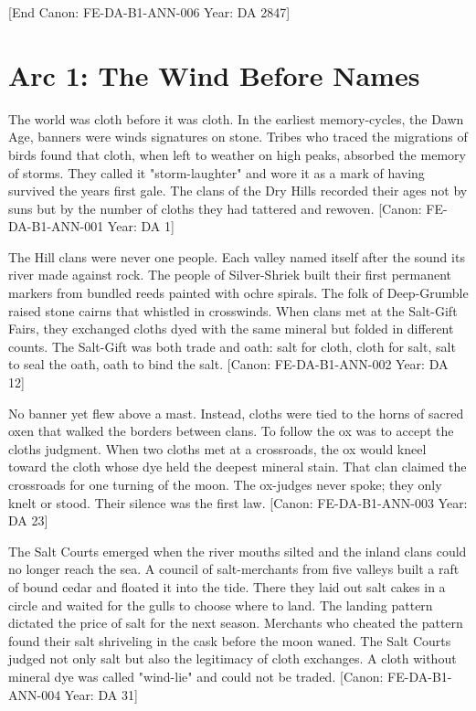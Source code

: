 {[}End Canon: FE-DA-B1-ANN-006 \textbar{} Year: DA 2847{]}

\section{Arc 1: \textquotesingle The Wind Before
Names\textquotesingle{}}\label{arc-1-the-wind-before-names}

The world was cloth before it was cloth. In the earliest memory-cycles,
the Dawn Age, banners were wind\textquotesingle s signatures on stone.
Tribes who traced the migrations of birds found that cloth, when left to
weather on high peaks, absorbed the memory of storms. They called it
"storm-laughter" and wore it as a mark of having survived the
year\textquotesingle s first gale. The clans of the Dry Hills recorded
their ages not by suns but by the number of cloths they had tattered and
rewoven. {[}Canon: FE-DA-B1-ANN-001 \textbar{} Year: DA 1{]}

The Hill clans were never one people. Each valley named itself after the
sound its river made against rock. The people of Silver-Shriek built
their first permanent markers from bundled reeds painted with ochre
spirals. The folk of Deep-Grumble raised stone cairns that whistled in
crosswinds. When clans met at the Salt-Gift Fairs, they exchanged cloths
dyed with the same mineral but folded in different counts. The Salt-Gift
was both trade and oath: salt for cloth, cloth for salt, salt to seal
the oath, oath to bind the salt. {[}Canon: FE-DA-B1-ANN-002 \textbar{}
Year: DA 12{]}

No banner yet flew above a mast. Instead, cloths were tied to the horns
of sacred oxen that walked the borders between clans. To follow the ox
was to accept the cloth\textquotesingle s judgment. When two cloths met
at a crossroads, the ox would kneel toward the cloth whose dye held the
deepest mineral stain. That clan claimed the crossroads for one turning
of the moon. The ox-judges never spoke; they only knelt or stood. Their
silence was the first law. {[}Canon: FE-DA-B1-ANN-003 \textbar{} Year:
DA 23{]}

The Salt Courts emerged when the river mouths silted and the inland
clans could no longer reach the sea. A council of salt-merchants from
five valleys built a raft of bound cedar and floated it into the tide.
There they laid out salt cakes in a circle and waited for the gulls to
choose where to land. The landing pattern dictated the price of salt for
the next season. Merchants who cheated the pattern found their salt
shriveling in the cask before the moon waned. The Salt Courts judged not
only salt but also the legitimacy of cloth exchanges. A cloth without
mineral dye was called "wind-lie" and could not be traded. {[}Canon:
FE-DA-B1-ANN-004 \textbar{} Year: DA 31{]}

